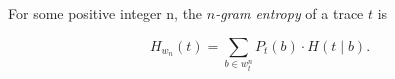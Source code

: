 
\begin{definition} For some positive integer n, the
  \textit{$n$-gram entropy} of a trace $t$ is

\begin{equation}
  H_{w_n}(t) = \sum_{b \in w^n_t} P_t(b) \cdot H(t \mid b).
\end{equation}

\end{definition}

